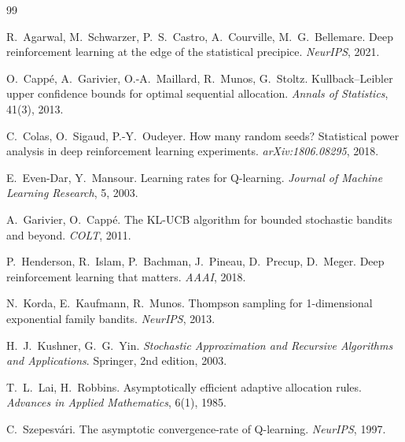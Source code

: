 \begin{thebibliography}{99}\small

R.~Agarwal, M.~Schwarzer, P.~S.~Castro, A.~Courville, M.~G.~Bellemare.
\newblock Deep reinforcement learning at the edge of the statistical precipice.
\newblock \emph{NeurIPS}, 2021.

O.~Capp\'e, A.~Garivier, O.-A.~Maillard, R.~Munos, G.~Stoltz.
\newblock Kullback--Leibler upper confidence bounds for optimal sequential allocation.
\newblock \emph{Annals of Statistics}, 41(3), 2013.

C.~Colas, O.~Sigaud, P.-Y.~Oudeyer.
\newblock How many random seeds? Statistical power analysis in deep reinforcement learning experiments.
\newblock \emph{arXiv:1806.08295}, 2018.

E.~Even-Dar, Y.~Mansour.
\newblock Learning rates for Q-learning.
\newblock \emph{Journal of Machine Learning Research}, 5, 2003.

A.~Garivier, O.~Capp\'e.
\newblock The KL-UCB algorithm for bounded stochastic bandits and beyond.
\newblock \emph{COLT}, 2011.

P.~Henderson, R.~Islam, P.~Bachman, J.~Pineau, D.~Precup, D.~Meger.
\newblock Deep reinforcement learning that matters.
\newblock \emph{AAAI}, 2018.

N.~Korda, E.~Kaufmann, R.~Munos.
\newblock Thompson sampling for 1-dimensional exponential family bandits.
\newblock \emph{NeurIPS}, 2013.

H.~J.~Kushner, G.~G.~Yin.
\newblock \emph{Stochastic Approximation and Recursive Algorithms and Applications}.
\newblock Springer, 2nd edition, 2003.

T.~L.~Lai, H.~Robbins.
\newblock Asymptotically efficient adaptive allocation rules.
\newblock \emph{Advances in Applied Mathematics}, 6(1), 1985.

C.~Szepesv\'ari.
\newblock The asymptotic convergence-rate of Q-learning.
\newblock \emph{NeurIPS}, 1997.

\end{thebibliography}
